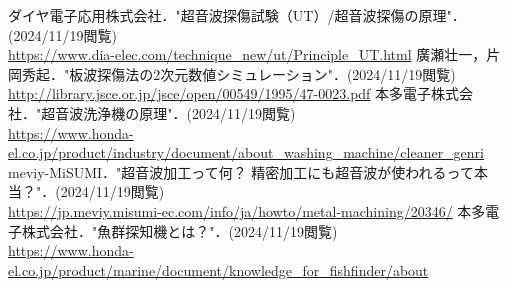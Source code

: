 \begin{thebibliography}{99}
     ダイヤ電子応用株式会社．"超音波探傷試験（UT）/超音波探傷の原理"．(2024/11/19閲覧)\\
    \url{https://www.dia-elec.com/technique_new/ut/Principle_UT.html}
     廣瀬壮一，片岡秀起．"板波探傷法の2次元数値シミュレーション"．(2024/11/19閲覧)\\
    \url{http://library.jsce.or.jp/jsce/open/00549/1995/47-0023.pdf}
     本多電子株式会社．"超音波洗浄機の原理"．(2024/11/19閲覧)\\
    \url{https://www.honda-el.co.jp/product/industry/document/about_washing_machine/cleaner_genri}
     meviy-MiSUMI．"超音波加工って何？ 精密加工にも超音波が使われるって本当？"．(2024/11/19閲覧)\\
    \url{https://jp.meviy.misumi-ec.com/info/ja/howto/metal-machining/20346/}
     本多電子株式会社．"魚群探知機とは？"．(2024/11/19閲覧)\\
    \url{https://www.honda-el.co.jp/product/marine/document/knowledge_for_fishfinder/about}
\end{thebibliography}
